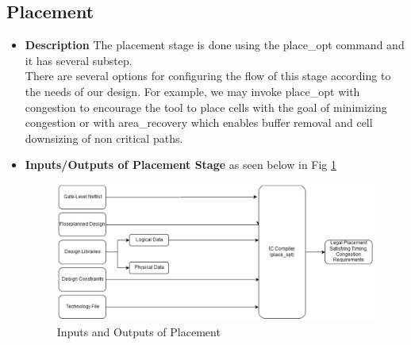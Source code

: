\documentclass[../main.tex]{subfiles}
\begin{document}
    \subsection{Placement}
    \begin{itemize}
\item \textbf{Description} The placement stage is done using the place\_opt command and it has several sub\-step. 
\\There are several options for configuring the 
flow of this stage according to the needs of our design. For example, we may invoke place\_opt
with \-congestion to encourage the tool to place cells with the goal of minimizing congestion 
or with \-area\_recovery which enables buffer removal and cell downsizing of non critical 
paths.


\item \textbf{Inputs/Outputs of Placement Stage} as seen below in Fig \ref{fig:IO_placment}

\begin{figure}[h]
\centering
\includegraphics[width=17cm]{diagrams/IO_placment.PNG}
\caption{ Inputs and Outputs of Placement}
\label{fig:IO_placment}
\end{figure}


\end{itemize}
\end{document}
